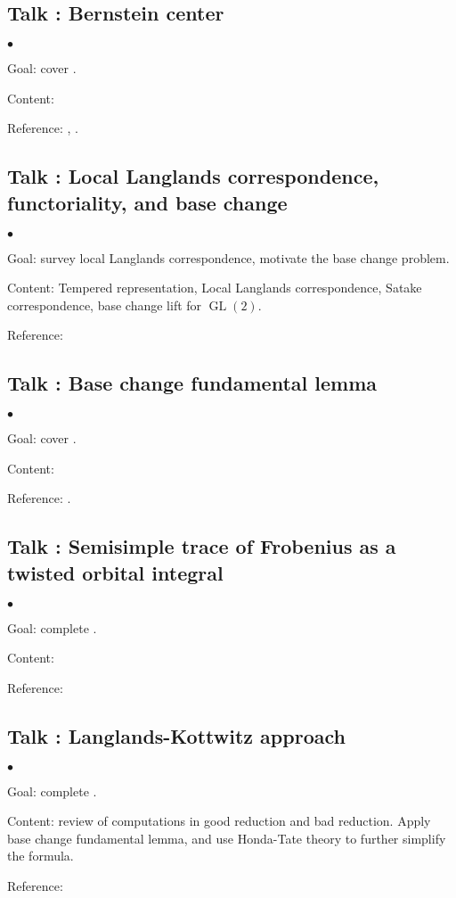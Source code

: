 \documentclass[a4paper, reqno]{amsart} %
\theoremstyle{definition}
\numberwithin{equation}{section}
\newenvironment{altitemize}
	{\begin{list}
			{$\bullet$}
			{\setlength{\labelwidth}{0pt}
				\setlength{\itemindent}{5pt}
				\setlength{\labelsep}{5pt}
				\setlength{\leftmargin}{0pt}
				\setlength{\itemsep}{\the\smallskipamount}
		}}
		{\end{list}}
\newcommand{\GL}{\operatorname{GL}}
\begin{document}
\subsection{Talk : Bernstein center}
\begin{altitemize}
\item[Goal:] cover \cite[\S 2]{Scholze-MC}.
\item[Content:] 
\item[Reference:] \cite{Bernstein-center}, \cite{RZhang-survey}.
\end{altitemize}


\subsection{Talk : Local Langlands correspondence, functoriality, and base change}
\begin{altitemize}
\item[Goal:] survey local Langlands correspondence, motivate the base change problem.
\item[Content:] Tempered representation, Local Langlands correspondence, Satake correspondence, base change lift for $\GL(2)$.
\item[Reference:] 
\end{altitemize}

\subsection{Talk : Base change fundamental lemma}
\begin{altitemize}
\item[Goal:] cover \cite[\S 3]{Scholze-MC}.
\item[Content:] 
\item[Reference:] \cite{RZhang-survey}.
\end{altitemize}


\subsection{Talk : Semisimple trace of Frobenius as a twisted orbital integral}
\begin{altitemize}
\item[Goal:] complete \cite[\S 9]{Scholze-MC}.
\item[Content:] 
\item[Reference:] 
\end{altitemize}




\subsection{Talk : Langlands-Kottwitz approach}
\begin{altitemize}
\item[Goal:] complete \cite[\S 10]{Scholze-MC}.
\item[Content:] review of computations in good reduction and bad reduction. Apply base change fundamental lemma, and use Honda-Tate theory to further simplify the formula. 
\item[Reference:] 
\end{altitemize}
\end{document}
